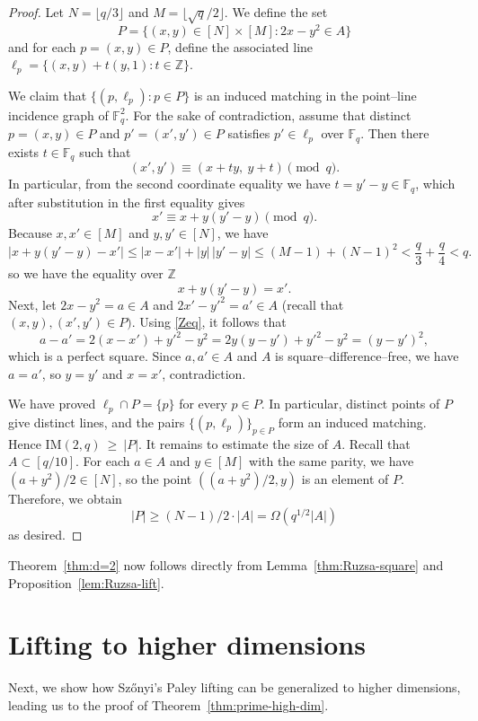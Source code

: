 \documentclass[12pt,reqno]{amsart}
\theoremstyle{plain}
\theoremstyle{definition}
\newcommand{\F}{\mathbb{F}}
\newcommand{\Z}{\mathbb{Z}}
\newcommand{\IM}{\mathrm{IM}}
\newcommand{\1}{\mathbf{1}}
\newcommand{\abs}[1]{\left|#1\right|}
\begin{document}
\begin{proof}
    Let $N = \lfloor q / 3 \rfloor$ and $M = \lfloor \sqrt{q} / 2 \rfloor$. We define the set 
    $$P = \{(x, y) \in [N] \times [M]: 2x - y^2 \in A\}$$
    and for each $p = (x,y) \in P$, define the associated line $\ell_p = \{(x, y) + t(y, 1): t\in \Z\}$. 
    
    We claim that $\{(p,\ell_p):p\in P\}$ is an induced matching in the point--line incidence graph of $\F_q^2$. For the sake of contradiction, assume that distinct $p = (x, y) \in P$ and $p' = (x', y') \in P$ satisfies $p' \in \ell_p$ over $\F_q$. Then there exists $t\in\F_q$ such that
$$(x',y') \equiv (x+ty,\ y+t) \pmod{q}.$$
In particular, from the second coordinate equality we have $t=y'-y \in \F_q$, which after substitution in the first equality gives
$$x' \equiv x+y(y'-y)\pmod q.$$
Because $x,x'\in [M]$ and $y,y'\in [N]$, we have
$$|x+y(y'-y)-x'| \le |x-x'|+|y|\,|y'-y| \le (M-1) + (N-1)^2 < \frac{q}{3}+\frac{q}{4} < q.$$
    so we have the equality over $\Z$
    \begin{equation} \label{Zeq}
    x + y(y' - y) = x'.
    \end{equation}
    Next, let $2x - y^2 = a \in A$ and $2x' - y'^2 = a' \in A$ (recall that $(x,y),(x',y') \in P)$. Using \eqref{Zeq}, it follows that
    $$a - a' = 2(x - x') + y'^2 - y^2 = 2 y(y - y') + y'^2 - y^2 = (y - y')^2,$$
    which is a perfect square. Since $a, a' \in A$ and $A$ is square--difference--free, we have $a = a'$, so $y = y'$ and $x = x'$, contradiction. 
    
    We have proved $\ell_p\cap P=\{p\}$ for every $p\in P$. In particular, distinct points of $P$ give distinct lines,
and the pairs $\{(p,\ell_p)\}_{p\in P}$ form an induced matching. Hence $\IM(2,q)\ \ge\ |P|$. It remains to estimate the size of $A$. Recall that $A \subset [q / 10]$. For each $a \in A$ and $y \in [M]$ with the same parity, we have $(a + y^2) / 2 \in [N]$, so the point $((a + y^2) / 2, y)$ is an element of $P$. Therefore, we obtain
    $$\abs{P} \geq (N - 1) / 2 \cdot |A| = \Omega(q^{1/2} |A|)$$
    as desired.
\end{proof}
Theorem~\ref{thm:d=2} now follows directly from Lemma~\ref{thm:Ruzsa-square} and Proposition~\ref{lem:Ruzsa-lift}.

\medskip
\section{Lifting to higher dimensions}
\label{sec:prime-highdim}
Next, we show how Sz\H{o}nyi's Paley lifting can be generalized to higher dimensions, leading us to the proof of Theorem~\ref{thm:prime-high-dim}.
\end{document}
